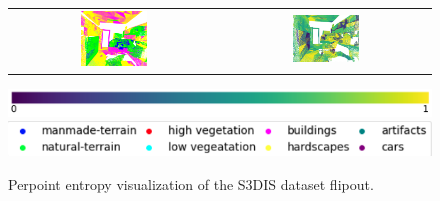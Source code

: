\begin{figure}[h!]
\begin{tabular}{cc}
            \includegraphics[width=0.33\textwidth, height=0.18\textheight]{images/seg_output/s3dis_DE/office_42.png}& 
            \includegraphics[width=0.33\textwidth, height=0.18\textheight]{images/seg_output/flipout/ent_fout_s3dis_4.png}\\
        \end{tabular}
        \includegraphics[scale=0.45]{images/prob_legend.pdf}
        \includegraphics[scale=0.65]{images/legend.png}
        \caption{Perpoint entropy visualization of the S3DIS dataset flipout.}
        \label{fig:fout_s3dis_entmap}
    \end{figure}
    \FloatBarrier
